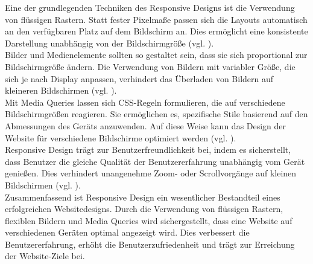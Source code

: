 \documentclass[fontsize=12pt,openright,oneside,paper=a4,BCOR=1cm]{scrbook}
\begin{document}
Eine der grundlegenden Techniken des Responsive Designs ist die Verwendung von flüssigen Rastern. Statt fester Pixelmaße passen sich die Layouts automatisch an den verfügbaren Platz auf dem Bildschirm an. Dies ermöglicht eine konsistente Darstellung unabhängig von der Bildschirmgröße (vgl. \cite{kadlec2012implementing}).\\

Bilder und Medienelemente sollten so gestaltet sein, dass sie sich proportional zur Bildschirmgröße ändern. Die Verwendung von Bildern mit variabler Größe, die sich je nach Display anpassen, verhindert das Überladen von Bildern auf kleineren Bildschirmen (vgl. \cite{kadlec2012implementing}). \\

Mit Media Queries lassen sich CSS-Regeln formulieren, die auf verschiedene Bildschirmgrößen reagieren. Sie ermöglichen es, spezifische Stile basierend auf den Abmessungen des Geräts anzuwenden. Auf diese Weise kann das Design der Website für verschiedene Bildschirme optimiert werden (vgl. \cite{kadlec2012implementing}). \\

Responsive Design trägt zur Benutzerfreundlichkeit bei, indem es sicherstellt, dass Benutzer die gleiche Qualität der Benutzererfahrung unabhängig vom Gerät genießen. Dies verhindert unangenehme Zoom- oder Scrollvorgänge auf kleinen Bildschirmen (vgl. \cite{activeweb}). \\

Zusammenfassend ist Responsive Design ein wesentlicher Bestandteil eines erfolgreichen Websitedesigns. Durch die Verwendung von flüssigen Rastern, flexiblen Bildern und Media Queries wird sichergestellt, dass eine Website auf verschiedenen Geräten optimal angezeigt wird. Dies verbessert die Benutzererfahrung, erhöht die Benutzerzufriedenheit und trägt zur Erreichung der Website-Ziele bei.

\end{document}
